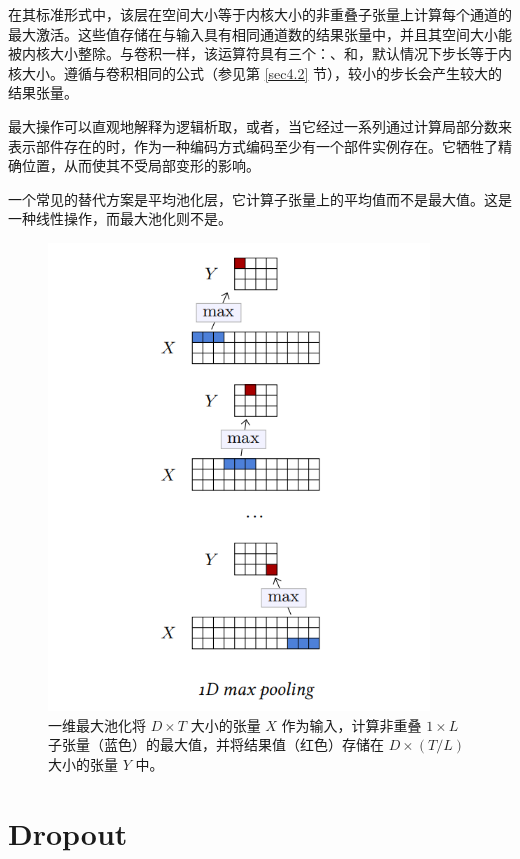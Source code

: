 在其标准形式中，该层在空间大小等于内核大小的非重叠子张量上计算每个通道的最大激活。这些值存储在与输入具有相同通道数的结果张量中，并且其空间大小能被内核大小整除。与卷积一样，该运算符具有三个：、和，默认情况下步长等于内核大小。遵循与卷积相同的公式（参见第 \ref{sec4.2} 节），较小的步长会产生较大的结果张量。

最大操作可以直观地解释为逻辑析取，或者，当它经过一系列通过计算局部分数来表示部件存在的时，作为一种编码方式编码至少有一个部件实例存在。它牺牲了精确位置，从而使其不受局部变形的影响。

一个常见的替代方案是平均池化层，它计算子张量上的平均值而不是最大值。这是一种线性操作，而最大池化则不是。

\begin{figure}
    \centering
    \includegraphics[width=0.9\textwidth]{fig/fig4.6.png}
    \caption[最大池化]{一维最大池化将 $D \times T$ 大小的张量 $X$ 作为输入，计算非重叠 $1 \times L$ 子张量（蓝色）的最大值，并将结果值（红色）存储在 $D \times (T / L)$ 大小的张量 $Y$ 中。}
    \label{fig4.6}
\end{figure}

\section{Dropout}\label{sec4.5}

